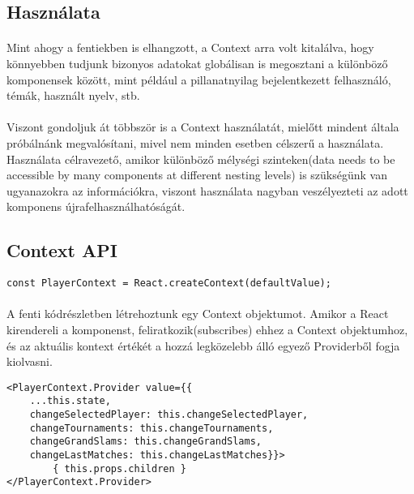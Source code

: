 \subsection{Használata}
\paragraph{}
Mint ahogy a fentiekben is elhangzott, a Context arra volt kitalálva, hogy könnyebben tudjunk bizonyos adatokat globálisan is megosztani a különböző komponensek között, mint például a pillanatnyilag bejelentkezett felhasználó, témák, használt nyelv, stb.

\paragraph{}
Viszont gondoljuk át többször is a Context használatát, mielőtt mindent általa próbálnánk megvalósítani, mivel nem minden esetben célszerű a használata. Használata célravezető,  amikor különböző mélységi szinteken(data needs to be accessible by many components at different nesting levels) is szükségünk van ugyanazokra az információkra, viszont használata nagyban veszélyezteti az adott komponens újrafelhasználhatóságát.

\subsection{Context API}

\begin{lstlisting}[caption=React Create Context]
const PlayerContext = React.createContext(defaultValue);
\end{lstlisting}

\paragraph{}
A fenti kódrészletben létrehoztunk egy Context objektumot. Amikor a React kirendereli a komponenst, feliratkozik(subscribes) ehhez a Context objektumhoz, és az aktuális kontext értékét a hozzá legközelebb álló egyező Providerből fogja kiolvasni.

\begin{lstlisting}[caption=React Context Provider]
<PlayerContext.Provider value={{ 
	...this.state, 
	changeSelectedPlayer: this.changeSelectedPlayer, 
	changeTournaments: this.changeTournaments, 
	changeGrandSlams: this.changeGrandSlams,  
	changeLastMatches: this.changeLastMatches}}>
    	{ this.props.children }
</PlayerContext.Provider>
\end{lstlisting}

